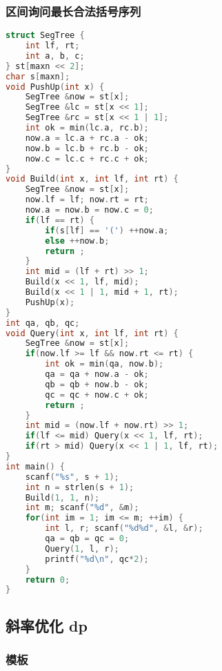 \subsubsection{区间询问最长合法括号序列}

\begin{lstlisting}[language=C++]
struct SegTree {
    int lf, rt;
    int a, b, c;
} st[maxn << 2];
char s[maxn];
void PushUp(int x) {
    SegTree &now = st[x];
    SegTree &lc = st[x << 1];
    SegTree &rc = st[x << 1 | 1];
    int ok = min(lc.a, rc.b);
    now.a = lc.a + rc.a - ok;
    now.b = lc.b + rc.b - ok;
    now.c = lc.c + rc.c + ok;
}
void Build(int x, int lf, int rt) {
    SegTree &now = st[x];
    now.lf = lf; now.rt = rt;
    now.a = now.b = now.c = 0;
    if(lf == rt) {
        if(s[lf] == '(') ++now.a;
        else ++now.b;
        return ;
    }
    int mid = (lf + rt) >> 1;
    Build(x << 1, lf, mid);
    Build(x << 1 | 1, mid + 1, rt);
    PushUp(x);
}
int qa, qb, qc;
void Query(int x, int lf, int rt) {
    SegTree &now = st[x];
    if(now.lf >= lf && now.rt <= rt) {
        int ok = min(qa, now.b);
        qa = qa + now.a - ok;
        qb = qb + now.b - ok;
        qc = qc + now.c + ok;
        return ;
    }
    int mid = (now.lf + now.rt) >> 1;
    if(lf <= mid) Query(x << 1, lf, rt);
    if(rt > mid) Query(x << 1 | 1, lf, rt);
}
int main() {
    scanf("%s", s + 1);
    int n = strlen(s + 1);
    Build(1, 1, n);
    int m; scanf("%d", &m);
    for(int im = 1; im <= m; ++im) {
        int l, r; scanf("%d%d", &l, &r);
        qa = qb = qc = 0;
        Query(1, l, r);
        printf("%d\n", qc*2);
    }
    return 0;
}
\end{lstlisting}

\subsection{斜率优化 dp}

\subsubsection{模板}

